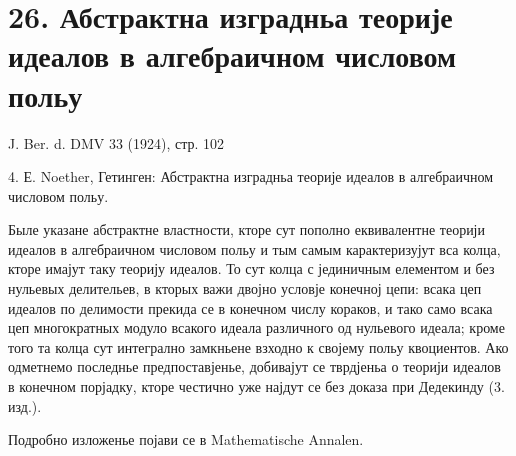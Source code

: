 ﻿\documentclass[11pt]{article}
\begin{document}
\section*{26. Абстрактна изградньа теорије идеалов в алгебраичном числовом польу}

\begin{center}
J. Ber. d. DMV 33 (1924), стр. 102
\end{center}

4. Е. Noether, Гетинген: Абстрактна изградньа теорије идеалов в алгебраичном числовом польу.

Быле указане абстрактне властности, кторе сут пополно еквивалентне теорији идеалов в алгебраичном числовом польу и тым самым карактеризујут вса колца, кторе имајут таку теорију идеалов. То сут колца с јединичным елементом и без нульевых делительев, в кторых важи двојно условје конечној цепи: всака цеп идеалов по делимости прекида се в конечном числу кораков, и тако само всака цеп многократных модуло всакого идеала различного од нульевого идеала; кроме того та колца сут интегрално замкньене взходно к својему польу квоциентов. Ако одметнемо последнье предпоставјенье, добивајут се тврдјеньа о теорији идеалов в конечном порјадку, кторе честично уже најдут се без доказа при Дедекинду (3. изд.).

Подробно изложенье појави се в Mathematische Annalen.
\end{document}
